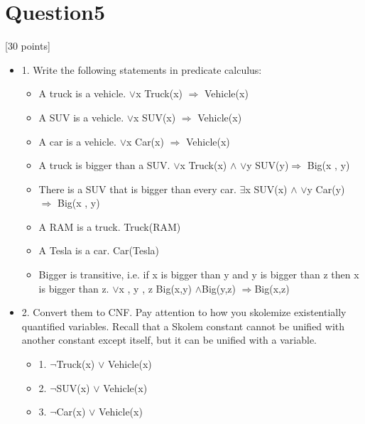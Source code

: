 \documentclass{article}
\begin{document}
\section{Question5}
[30 points]
\begin{itemize}
    
\item 1.    Write the following statements in predicate calculus:
        \begin{itemize}
            \item A truck is a vehicle.\newline
            $\vee$x Truck(x) $\Rightarrow$ Vehicle(x)
            \item A SUV is a vehicle.\newline
            $\vee$x SUV(x) $\Rightarrow$ Vehicle(x)
            \item A car is a vehicle.\newline
            $\vee$x Car(x) $\Rightarrow$ Vehicle(x)
            \item A truck is bigger than a SUV.\newline
            $\vee$x Truck(x) $\wedge$ $\vee$y SUV(y)$\Rightarrow$ Big(x , y)
            \item There is a SUV that is bigger than every car.\newline
            $\exists$x SUV(x) $\wedge$ $\vee$y Car(y) $\Rightarrow$ Big(x , y)
            \item A RAM is a truck.\newline
            Truck(RAM)
            \item A Tesla is a car.\newline
            Car(Tesla)
            \item Bigger is transitive, i.e. if x is bigger than y and y is bigger than z then x is bigger than z.
            $\vee$x , y , z Big(x,y) $\wedge$Big(y,z) $\Rightarrow$Big(x,z)
        \end{itemize}
\item 2.    Convert them to CNF. Pay attention to how you skolemize existentially quantified variables. Recall that a Skolem constant cannot be unified with another constant except itself, but it can be unified with a variable.
\begin{itemize}
    \item 1.	$\neg$Truck(x) $\vee$ Vehicle(x)
    \item 2.	$\neg$SUV(x) $\vee$ Vehicle(x)
    \item 3.	$\neg$Car(x) $\vee$ Vehicle(x)

\end{itemize}
\end{itemize}
\end{document}

